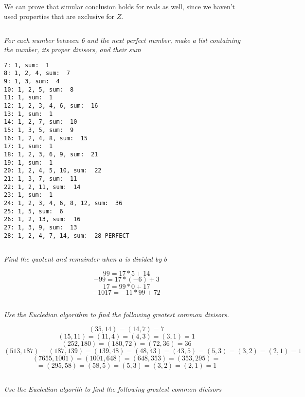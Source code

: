 \documentclass[11pt,oneside,titlepage]{book}
\begin{document}
We can prove that simular conclusion holds for reals as well, since we haven't used properties
that are exclusive for $Z$.

\subsection{}

\textit{For each number between 6 and the next perfect number, make a list containing the number,
its proper divisors, and their sum}

\begin{verbatim}
7: 1, sum:  1
8: 1, 2, 4, sum:  7
9: 1, 3, sum:  4
10: 1, 2, 5, sum:  8
11: 1, sum:  1
12: 1, 2, 3, 4, 6, sum:  16
13: 1, sum:  1
14: 1, 2, 7, sum:  10
15: 1, 3, 5, sum:  9
16: 1, 2, 4, 8, sum:  15
17: 1, sum:  1
18: 1, 2, 3, 6, 9, sum:  21
19: 1, sum:  1
20: 1, 2, 4, 5, 10, sum:  22
21: 1, 3, 7, sum:  11
22: 1, 2, 11, sum:  14
23: 1, sum:  1
24: 1, 2, 3, 4, 6, 8, 12, sum:  36
25: 1, 5, sum:  6
26: 1, 2, 13, sum:  16
27: 1, 3, 9, sum:  13
28: 1, 2, 4, 7, 14, sum:  28 PERFECT
\end{verbatim}

\subsection{}

\textit{Find the quotent and remainder when $a$ is divided by $b$}

$$99 = 17 * 5 + 14$$
$$-99 = 17 * (-6) + 3$$
$$17 = 99 * 0 + 17$$
$$-1017 = -11 * 99 + 72$$

\subsection{}

\textit{Use the Eucledian algorithm to find the following greatest common divisors.}

$$(35, 14) = (14, 7) = 7$$
$$(15, 11) = (11, 4) = (4, 3) = (3, 1) = 1$$
$$(252, 180) = (180, 72) = (72, 36) = 36$$
$$(513, 187) = (187, 139) = (139, 48) = (48, 43) = (43, 5) = (5, 3) = (3, 2) = (2, 1) = 1$$
$$(7655, 1001) = (1001, 648) = (648, 353) = (353, 295) = $$
$$ = (295, 58) = (58, 5) = (5, 3) = (3, 2) = (2, 1) = 1$$

\subsection{}

\textit{Use the Eucledian algorith to find the following greatest common divisors}
\end{document}
